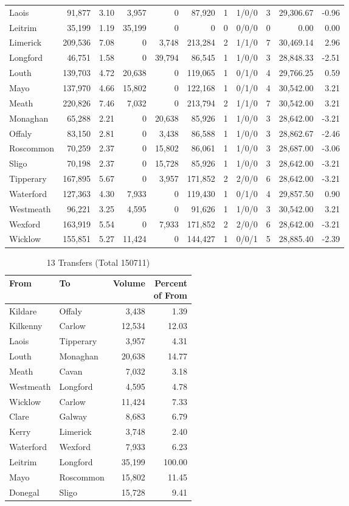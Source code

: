 \documentclass[a4paper]{article}
\begin{document}
\begin{longtable}{lrrrrrrlrrr}
Laois&91,877& 3.10&3,957&0&87,920&1&1/0/0&3&29,306.67&-0.96\\ 
Leitrim&35,199& 1.19&35,199&0&0&0&0/0/0&0& 0.00& 0.00\\ 
Limerick&209,536& 7.08&0&3,748&213,284&2&1/1/0&7&30,469.14& 2.96\\ 
Longford&46,751& 1.58&0&39,794&86,545&1&1/0/0&3&28,848.33&-2.51\\ 
Louth&139,703& 4.72&20,638&0&119,065&1&0/1/0&4&29,766.25& 0.59\\ 
Mayo&137,970& 4.66&15,802&0&122,168&1&0/1/0&4&30,542.00& 3.21\\ 
Meath&220,826& 7.46&7,032&0&213,794&2&1/1/0&7&30,542.00& 3.21\\ 
Monaghan&65,288& 2.21&0&20,638&85,926&1&1/0/0&3&28,642.00&-3.21\\ 
Offaly&83,150& 2.81&0&3,438&86,588&1&1/0/0&3&28,862.67&-2.46\\ 
Roscommon&70,259& 2.37&0&15,802&86,061&1&1/0/0&3&28,687.00&-3.06\\ 
Sligo&70,198& 2.37&0&15,728&85,926&1&1/0/0&3&28,642.00&-3.21\\ 
Tipperary&167,895& 5.67&0&3,957&171,852&2&2/0/0&6&28,642.00&-3.21\\ 
Waterford&127,363& 4.30&7,933&0&119,430&1&0/1/0&4&29,857.50& 0.90\\ 
Westmeath&96,221& 3.25&4,595&0&91,626&1&1/0/0&3&30,542.00& 3.21\\ 
Wexford&163,919& 5.54&0&7,933&171,852&2&2/0/0&6&28,642.00&-3.21\\ 
Wicklow&155,851& 5.27&11,424&0&144,427&1&0/0/1&5&28,885.40&-2.39\\ 
\end{longtable}

\begin{table}[htbp]
\caption{13 Transfers (Total 150711)}
\centering
\begin{tabular}{llrr} \toprule
From &To &Volume &\shortstack{Percent\\of From} \\ \midrule
Kildare&Offaly&3,438& 1.39\\ 
Kilkenny&Carlow&12,534&12.03\\ 
Laois&Tipperary&3,957& 4.31\\ 
Louth&Monaghan&20,638&14.77\\ 
Meath&Cavan&7,032& 3.18\\ 
Westmeath&Longford&4,595& 4.78\\ 
Wicklow&Carlow&11,424& 7.33\\ 
Clare&Galway&8,683& 6.79\\ 
Kerry&Limerick&3,748& 2.40\\ 
Waterford&Wexford&7,933& 6.23\\ 
Leitrim&Longford&35,199&100.00\\ 
Mayo&Roscommon&15,802&11.45\\ 
Donegal&Sligo&15,728& 9.41\\ 
\bottomrule
\end{tabular}
\end{table}
\end{document}

